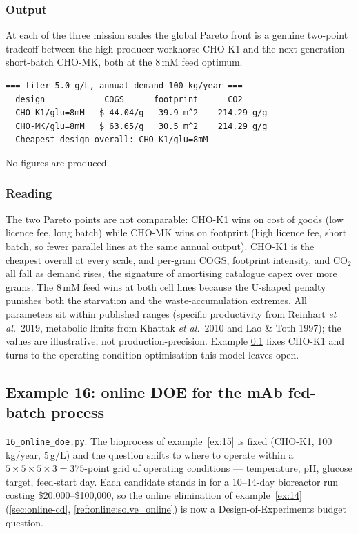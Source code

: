 \documentclass[11pt,a4paper]{article}
\newcommand{\etal}{\textit{et al.}}
\begin{document}
\subsubsection*{Output}

At each of the three mission scales the global Pareto front is a genuine
two-point tradeoff between the high-producer workhorse CHO-K1 and the
next-generation short-batch CHO-MK, both at the 8\,mM feed optimum.

\begin{lstlisting}[language={},numbers=none,keywordstyle={}]
=== titer 5.0 g/L, annual demand 100 kg/year ===
  design            COGS      footprint      CO2
  CHO-K1/glu=8mM   $ 44.04/g   39.9 m^2    214.29 g/g
  CHO-MK/glu=8mM   $ 63.65/g   30.5 m^2    214.29 g/g
  Cheapest design overall: CHO-K1/glu=8mM
\end{lstlisting}

No figures are produced.

\subsubsection*{Reading}

The two Pareto points are not comparable: CHO-K1 wins on cost of goods
(low licence fee, long batch) while CHO-MK wins on footprint (high
licence fee, short batch, so fewer parallel lines at the same annual
output). CHO-K1 is the cheapest overall at every scale, and per-gram
COGS, footprint intensity, and CO$_2$ all fall as demand rises, the
signature of amortising catalogue capex over more grams. The 8\,mM feed
wins at both cell lines because the U-shaped penalty punishes both the
starvation and the waste-accumulation extremes. All parameters sit
within published ranges (specific productivity from Reinhart \etal\
2019, metabolic limits from Khattak \etal\ 2010 and Lao \& Toth 1997);
the values are illustrative, not production-precision. Example
\ref{ex:16} fixes CHO-K1 and turns to the operating-condition
optimisation this model leaves open.

\subsection{Example 16: online DOE for the mAb fed-batch process}
\label{ex:16}

\texttt{16\_online\_doe.py}. The bioprocess of example~\ref{ex:15} is
fixed (CHO-K1, 100\,kg/year, 5\,g/L) and the question shifts to where to
operate within a $5\times5\times5\times3 = 375$-point grid of operating
conditions --- temperature, pH, glucose target, feed-start day. Each
candidate stands in for a 10--14-day bioreactor run costing
\$20{,}000--\$100{,}000, so the online elimination of
example~\ref{ex:14} (\ref{sec:online-cd},
\ref{ref:online:solve_online}) is now a Design-of-Experiments budget
question.
\end{document}
